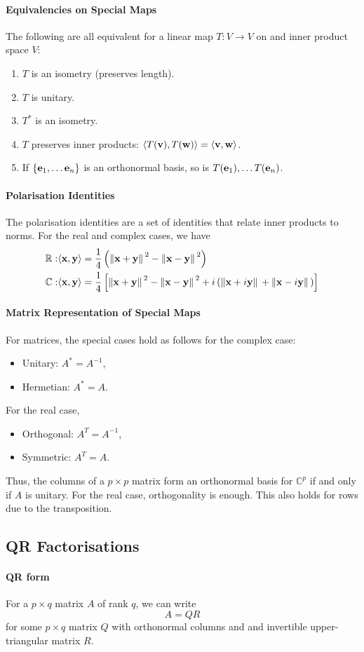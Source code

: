 \paragraph{Equivalencies on Special Maps}
The following are all equivalent for a linear map \( T: V \to V \) on
and inner product space \( V \):
\begin{enumerate}
    \item \( T \) is an isometry (preserves length).
    \item \( T \) is unitary.
    \item \( T^* \) is an isometry.
    \item \( T \) preserves inner products: \( \langle T(\mathbf{v}), T(\mathbf{w}) \rangle = \langle \mathbf{v}, \mathbf{w} \rangle \).
    \item If \( \left\{ \mathbf{e}_1, \dots \mathbf{e}_n \right\} \) is an orthonormal basis,
        so is \( T(\mathbf{e}_1),\dots T(\mathbf{e}_n) \).
\end{enumerate}

\paragraph{Polarisation Identities}
The polarisation identities are a set of identities that relate inner products
to norms. For the real and complex cases, we have
\begin{align*}
    \mathbb{R}:& \langle \mathbf{x}, \mathbf{y} \rangle = \frac{1}{4}\left(
        \norm*{\mathbf{x} + \mathbf{y}}^2 - \norm*{\mathbf{x} - \mathbf{y}}^2
    \right) \\
    \mathbb{C}:& \langle \mathbf{x}, \mathbf{y} \rangle = \frac{1}{4}\left[
        \norm*{\mathbf{x} + \mathbf{y}}^2 - \norm*{\mathbf{x} - \mathbf{y}}^2
        + i \left(\norm*{\mathbf{x} + i\mathbf{y}} + \norm*{\mathbf{x} -i\mathbf{y}} \right)
    \right]
\end{align*} 

\paragraph{Matrix Representation of Special Maps}
For matrices, the special cases hold as follows for the complex case:
\begin{itemize}
    \item Unitary: \( A^* = A^{-1} \),
    \item Hermetian: \( A^* = A \).
\end{itemize}
For the real case,
\begin{itemize}
    \item Orthogonal: \( A^T = A^{-1} \),
    \item Symmetric: \( A^T = A \).
\end{itemize}
Thus, the columns of a \( p\times p \) matrix form an orthonormal basis
for \( \mathbb{C}^p \) if and only if \( A \) is unitary.
For the real case, orthogonality is enough.
This also holds for rows due to the transposition.

\subsection{QR Factorisations}

\paragraph{QR form}
For a \( p\times q \) matrix \( A \) of rank \( q \), we can write \[
    A = QR
\]
for some \( p\times q \) matrix \( Q \) with orthonormal columns and
and invertible upper-triangular matrix \( R \).